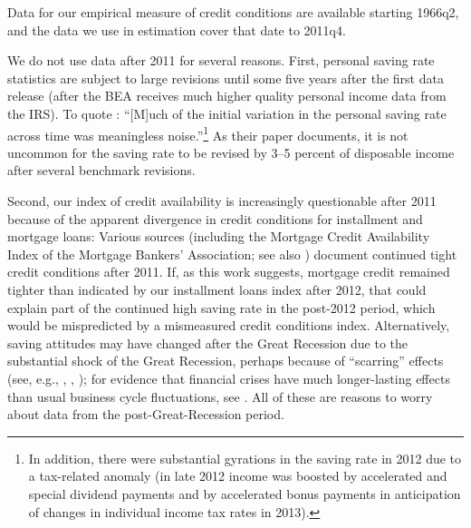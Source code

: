 Data for our empirical measure of credit conditions are available starting 1966q2, and the data we use in estimation cover that date to 2011q4.

We do not use data after 2011 for several reasons. First, personal saving rate statistics are subject to large revisions until some five years  after the first data release (after the BEA receives much higher quality personal income data from the IRS).  To quote \cite{nsSavingRevisions}: ``[M]uch of the initial variation in the personal saving rate across time was meaningless noise.''\footnote{In addition, there were substantial gyrations in the saving rate in 2012 due to a tax-related anomaly (in late 2012 income was boosted by accelerated and special dividend payments and by accelerated bonus payments in anticipation of changes in individual income tax rates in 2013).} As  their paper documents, it is not uncommon for the saving rate to be revised by 3--5 percent of disposable income after several benchmark revisions.

Second, our index of credit availability is increasingly questionable after 2011 because of the apparent divergence in credit conditions for installment and mortgage loans: Various sources (including the Mortgage Credit Availability Index of the Mortgage Bankers' Association; see also \cite{bhutta_mortgageDebt}) document continued tight credit conditions after 2011.  If, as this work suggests, mortgage credit remained tighter than indicated by our installment loans index after 2012, that could explain part of the continued high saving rate in the post-2012 period, which would be mispredicted by a mismeasured credit conditions index.  Alternatively, saving attitudes may have changed after the Great Recession due to the substantial shock of the Great Recession, perhaps because of ``scarring'' effects  (see, e.g., \cite{malmendierSheng}, \cite{jstLeveragedBubbles}, \cite{hallQuantifying}); for evidence that financial crises have much longer-lasting effects than usual business cycle fluctuations, see \cite{rrAftermath}.  All of these are reasons to worry about data from the post-Great-Recession period.
